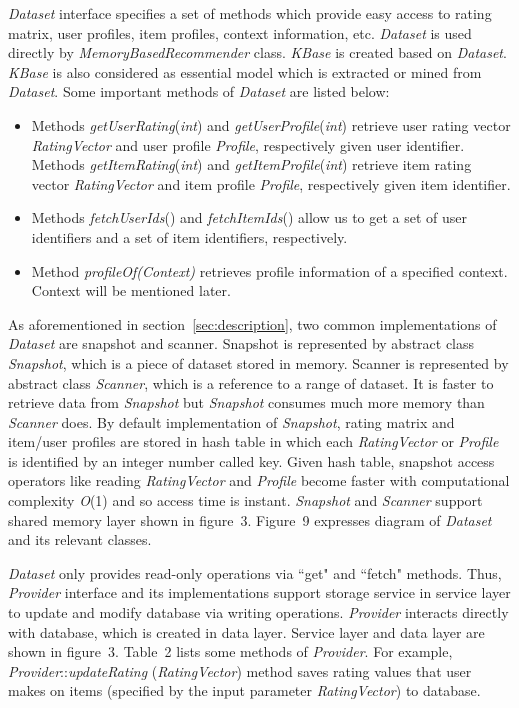 \documentclass[a4paper]{llncs}
\begin{document}
\textit{Dataset} interface specifies a set of methods which provide easy access to rating matrix, user profiles, item profiles, context information, etc. \textit{Dataset} is used directly by \textit{MemoryBasedRecommender} class. \textit{KBase} is created based on \textit{Dataset}. \textit{KBase} is also considered as essential model which is extracted or mined from \textit{Dataset}. Some important methods of \textit{Dataset} are listed below:
\begin{itemize}
\item Methods \textit{getUserRating}(\textit{int}) and \textit{getUserProfile}(\textit{int}) retrieve user rating vector \textit{RatingVector} and user profile \textit{Profile}, respectively given user identifier. Methods \textit{getItemRating}(\textit{int}) and \textit{getItemProfile}(\textit{int}) retrieve item rating vector \textit{RatingVector} and item profile \textit{Profile}, respectively given item identifier.
\item Methods \textit{fetchUserIds}() and \textit{fetchItemIds}() allow us to get a set of user identifiers and a set of item identifiers, respectively.
\item Method \textit{profileOf(Context)} retrieves profile information of a specified context. Context will be mentioned later.
\end{itemize}
As aforementioned in section~\ref{sec:description}, two common implementations of \textit{Dataset} are snapshot and scanner. Snapshot is represented by abstract class \textit{Snapshot}, which is a piece of dataset stored in memory. Scanner is represented by abstract class \textit{Scanner}, which is a reference to a range of dataset. It is faster to retrieve data from \textit{Snapshot} but \textit{Snapshot} consumes much more memory than \textit{Scanner} does. By default implementation of \textit{Snapshot}, rating matrix and item/user profiles are stored in hash table in which each \textit{RatingVector} or \textit{Profile} is identified by an integer number called key. Given hash table, snapshot access operators like reading \textit{RatingVector} and \textit{Profile} become faster with computational complexity \textit{O}(1) and so access time is instant. \textit{Snapshot} and \textit{Scanner} support shared memory layer shown in figure~3. Figure~9 expresses diagram of \textit{Dataset} and its relevant classes.

\textit{Dataset} only provides read-only operations via ``get" and ``fetch" methods. Thus, \textit{Provider} interface and its implementations support storage service in service layer to update and modify database via writing operations. \textit{Provider} interacts directly with database, which is created in data layer. Service layer and data layer are shown in figure~3. Table~2 lists some methods of \textit{Provider}. For example, \textit{Provider}::\textit{updateRating} (\textit{RatingVector}) method saves rating values that user makes on items (specified by the input parameter \textit{RatingVector}) to database.
\end{document}
